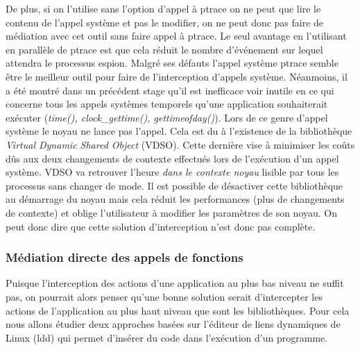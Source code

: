 De plus, si on l'utilise sans l'option d'appel à ptrace on ne peut que lire le
contenu de l'appel système et pas le modifier, on ne peut donc pas faire de
médiation avec cet outil sans faire appel à ptrace. Le seul avantage en
l'utilisant en parallèle de ptrace est que cela réduit le nombre d'événement sur
lequel attendra le processus espion.
\newline
Malgré ses défauts l'appel système ptrace semble être le meilleur outil pour
faire de l'interception d'appels système. Néanmoins, il a été montré dans un
précédent stage \cite{INTERCEPTION:MARION} qu'il est
inefficace voir inutile en ce qui concerne tous les appels systèmes temporels
qu'une application souhaiterait exécuter (\textit{time(), clock\_gettime(),
  gettimeofday()}). Lors de ce genre d'appel système le noyau ne lance pas
l'appel. Cela est du à l'existence de la bibliothèque \textit{Virtual Dynamic
  Shared Object} (VDSO). Cette dernière vise à minimiser les coûts dûs aux deux
changements de contexte effectués lors de l'exécution d'un appel système. VDSO
va retrouver l'heure \textit{{\color{red}dans le contexte noyau}} lisible par tous les
processus sans changer de mode. Il est possible de désactiver cette bibliothèque
au démarrage du noyau mais cela réduit les performances (plus de changements de
contexte) et oblige l'utilisateur à modifier les paramètres de son noyau. On
peut donc dire que cette solution d'interception n'est donc pas complète.


\subsubsection{Médiation directe des appels de fonctions}

Puisque l'interception des actions d'une application au plus bas niveau ne
suffit pas, on pourrait alors penser qu'une bonne solution serait d'intercepter
les actions de l'application au plus haut niveau que sont les
bibliothèques. Pour cela nous allons étudier deux approches basées sur l'éditeur
de liens dynamiques de Linux (ldd) qui permet d'insérer du code dans l'exécution
d'un programme.

